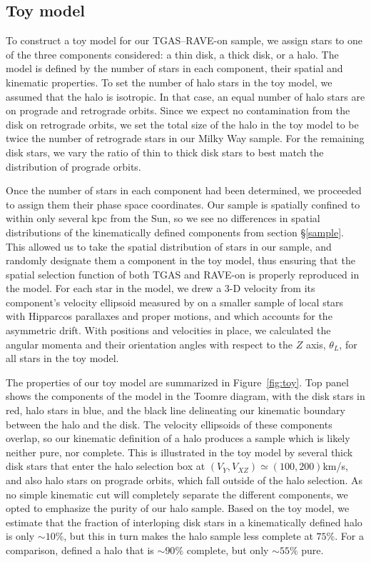 \documentclass[apj, twocolappendix, numberedappendix, appendixfloats]{emulateapj}
\begin{document}
\subsection{Toy model}
\label{sec:toymodel}
To construct a toy model for our TGAS--RAVE-on sample, we assign stars to one of the three components considered: a thin disk, a thick disk, or a halo.
The model is defined by the number of stars in each component, their spatial and kinematic properties.
To set the number of halo stars in the toy model, we assumed that the halo is isotropic.
In that case, an equal number of halo stars are on prograde and retrograde orbits. 
Since we expect no contamination from the disk on retrograde orbits, we set the total size of the halo in the toy model to be twice the number of retrograde stars in our Milky Way sample.
For the remaining disk stars, we vary the ratio of thin to thick disk stars to best match the distribution of prograde orbits.

Once the number of stars in each component had been determined, we proceeded to assign them their phase space coordinates.
Our sample is spatially confined to within only several kpc from the Sun, so we see no differences in spatial distributions of the kinematically defined components from section \S\ref{sample}.
This allowed us to take the spatial distribution of stars in our sample, and randomly designate them a component in the toy model, thus ensuring that the spatial selection function of both TGAS and RAVE-on is properly reproduced in the model.
For each star in the model, we drew a 3-D velocity from its component's velocity ellipsoid measured by \citet{bensby2003} on a smaller sample of local stars with Hipparcos parallaxes and proper motions, and which accounts for the asymmetric drift.
With positions and velocities in place, we calculated the angular momenta and their orientation angles with respect to the $Z$ axis, $\theta_L$, for all stars in the toy model.

The properties of our toy model are summarized in Figure~\ref{fig:toy}.
Top panel shows the components of the model in the Toomre diagram, with the disk stars in red, halo stars in blue, and the black line delineating our kinematic boundary between the halo and the disk.
The velocity ellipsoids of these components overlap, so our kinematic definition of a halo produces a sample which is likely neither pure, nor complete.
This is illustrated in the toy model by several thick disk stars that enter the halo selection box at $(V_Y, V_{XZ}) \simeq (100,200)$\;km/s, and also halo stars on prograde orbits, which fall outside of the halo selection.
As no simple kinematic cut will completely separate the different components, we opted to emphasize the purity of our halo sample.
Based on the toy model, we estimate that the fraction of interloping disk stars in a kinematically defined halo is only $\sim10\%$, but this in turn makes the halo sample less complete at $75\%$.
For a comparison, \citet{ns2010} defined a halo that is $\sim90\%$ complete, but only $\sim55\%$ pure.
\end{document}
